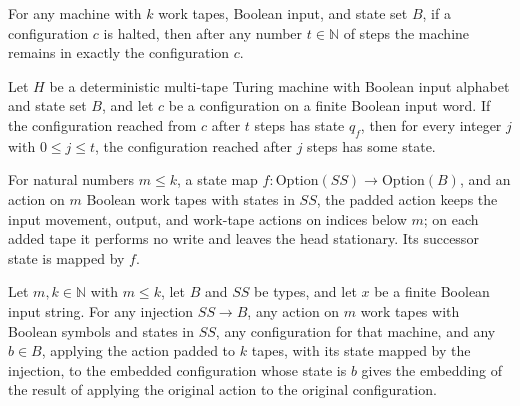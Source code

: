 \begin{theorem}
\label{Turing.runFrom_of_halted}
\leanok
{}
For any machine with $k$ work tapes, Boolean input, and state set $B$, if a
configuration $c$ is halted, then after any number $t\in\mathbb N$ of steps the machine
remains in exactly the configuration $c$.
\end{theorem}

\begin{theorem}
\label{Turing.state_isSome_of_runFrom}
\leanok
{}
Let $H$ be a deterministic multi-tape Turing machine with Boolean input alphabet and
state set $B$, and let $c$ be a configuration on a finite Boolean input word. If the
configuration reached from $c$ after $t$ steps has state $q_f$, then for every integer
$j$ with $0\le j\le t$, the configuration reached after $j$ steps has some state.
\end{theorem}

\begin{definition}
\label{Turing.padAction}
\leanok
{}
For natural numbers $m\le k$, a state map $f:\mathrm{Option}(SS)\to\mathrm{Option}(B)$, and
an action on $m$ Boolean work tapes with states in $SS$, the padded action keeps the
input movement, output, and work-tape actions on indices below $m$; on each added tape it
performs no write and leaves the head stationary. Its successor state is mapped by $f$.
\end{definition}

\begin{theorem}
\label{Turing.padAction_apply}
\leanok
{}
Let $m,k\in\mathbb{N}$ with $m\le k$, let $B$ and $SS$ be types, and let $x$ be a
finite Boolean input string. For any injection $SS\to B$, any action on $m$ work tapes
with Boolean symbols and states in $SS$, any configuration for that machine, and any
$b\in B$, applying the action padded to $k$ tapes, with its state mapped by the injection,
to the embedded configuration whose state is $b$ gives the embedding of the result of
applying the original action to the original configuration.
\end{theorem}

